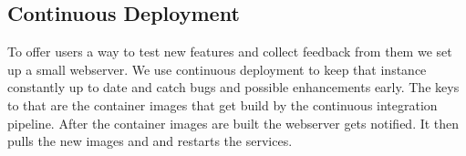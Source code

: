 \subsection{Continuous Deployment}
To offer users a way to test new features and collect feedback from them we set up a small webserver. We use continuous deployment to keep that instance constantly up to date and catch bugs and possible enhancements early. The keys to that are the container images that get build by the continuous integration pipeline. After the container images are built the webserver gets notified. It then pulls the new images and and restarts the services.
